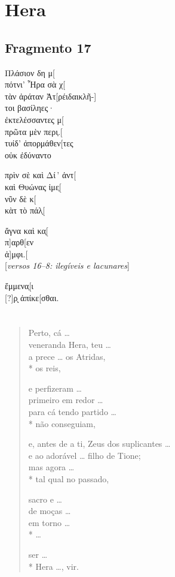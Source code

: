 \chapter{Hera}

\section{Fragmento 17}

\begin{gkverse}
Πλάσιον δη μ[\\
πότνι’ Ἦρα σὰ χ[\\
τὰν ἀράταν Ἀτ[ρέιδαι\qquad        κλῆ-]\\
τοι βασίληες·\\

ἐκτελέσσαντες μ[\\
πρῶτα μὲν περι̣.[\\
τυίδ’ ἀπορμάθεν[τες\\
οὐκ ἐδύναντο

πρὶν σὲ καὶ Δί\,’ ἀντ[\\
καὶ Θυώνας ἰμε̣[\\
νῦν δὲ κ[\\
κὰτ τὸ πάλ̣[

ἄγνα καὶ κα̣[\\
π]αρθ[εν\\
ἀ]μφι.[\\

\textnormal{[\textit{versos 16--8: ilegíveis e lacunares}]}

ἔμμενα̣[ι\\
{[}?{]}ρ̣ ̣ἀπίκε[σθαι.
\end{gkverse}

\chapter*{}
\section*{}

\begin{verse}
Perto, cá \ldots{}\\
veneranda Hera, teu \ldots{}\\
a prece \ldots{} os Atridas,\\*
os reis,

e perfizeram \ldots{}\\
primeiro em redor \ldots{}\\
para cá tendo partido \ldots{}\\*
não conseguiam,

e, antes de a ti, Zeus dos suplicantes \ldots{}\\
e ao adorável \ldots{} filho de Tione;\\
mas agora \ldots{}\\*
tal qual no passado,

sacro e \ldots{}\\
de moças \ldots{}\\
em torno \ldots{}\\*
\ldots{}

ser \ldots{}\\*
Hera \ldots{}, vir.
\end{verse}

